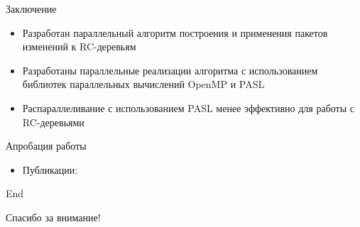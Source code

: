\documentclass[hyperref=unicode,graphics=pdflatex,13pt]{beamer}
\begin{document}
\begin{frame}[shrink]{Заключение}
\begin{itemize}
    \item Разработан параллельный алгоритм построения и применения пакетов изменений к RC-деревьям
    \item Разработаны параллельные реализации алгоритма с использованием библиотек параллельных вычислений OpenMP и PASL
    \item Распараллеливание с использованием PASL менее эффективно для работы с RC-деревьями
\end{itemize}

\end{frame}

\begin{frame}[shrink]{Апробация работы}
\begin{itemize}
\item Публикации:\nocite{wjf-kmu, wjf-spisok}
\printbibliography 
\end{itemize}
\end{frame}
\begin{frame}[shrink]{End}
\begin{center}
\Huge Спасибо за внимание!
\end{center}
\end{frame}
\end{document}
